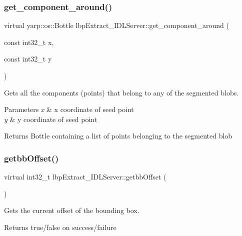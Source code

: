 \subsubsection{\texorpdfstring{get\_component\_around()}{get\_component\_around()}}
{\footnotesize\ttfamily virtual yarp\+::os\+::\+Bottle lbp\+Extract\+\_\+\+I\+D\+L\+Server\+::get\+\_\+component\+\_\+around (\begin{DoxyParamCaption}\item[{const int32\+\_\+t}]{x,  }\item[{const int32\+\_\+t}]{y }\end{DoxyParamCaption})\hspace{0.3cm}{\ttfamily [virtual]}}



Gets all the components (points) that belong to any of the segmented blobs. 


\begin{DoxyParams}{Parameters}
{\em x} & x coordinate of seed point \\
\hline
{\em y} & y coordinate of seed point \\
\hline
\end{DoxyParams}
\begin{DoxyReturn}{Returns}
Bottle containing a list of points belonging to the segmented blob 
\end{DoxyReturn}
\mbox{\label{classlbpExtract__IDLServer_a2260626a2137fc9ffe9364fad3444024}} 
\subsubsection{\texorpdfstring{getbbOffset()}{getbbOffset()}}
{\footnotesize\ttfamily virtual int32\+\_\+t lbp\+Extract\+\_\+\+I\+D\+L\+Server\+::getbb\+Offset (\begin{DoxyParamCaption}{ }\end{DoxyParamCaption})\hspace{0.3cm}{\ttfamily [virtual]}}



Gets the current offset of the bounding box. 

\begin{DoxyReturn}{Returns}
true/false on success/failure 
\end{DoxyReturn}
\mbox{\label{classlbpExtract__IDLServer_ae6f220a2b984c7211bd59beca4db0373}} 
